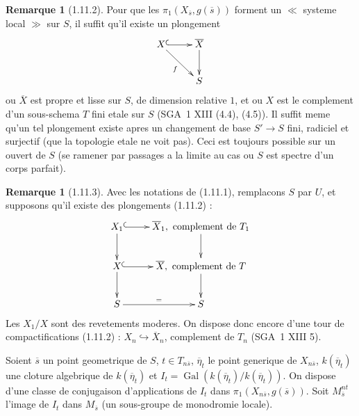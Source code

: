 \documentclass[12pt,a4paper]{article}
\theoremstyle{plain}
\theoremstyle{definition}
\newtheorem{remarque}[theorem]{Remarque}
\theoremstyle{definition}
\theoremstyle{remark}
\DeclareMathOperator{\Gal}{Gal}
\begin{document}
\begin{remarque}[1.11.2]
Pour que les $\pi_1(X_{\overline{s}}, g(\overline{s}))$ forment un $\ll$ systeme local $\gg$ sur $S$, il suffit qu'il existe un plongement
\[\xymatrix{
X \ar@{^{(}->}[r] \ar[dr]_f & \overline{X} \ar[d] \\
& S
}\]
ou $\overline{X}$ est propre et lisse sur $S$, de dimension relative $1$, et ou $X$ est le complement d'un sous-schema $T$ fini etale sur $S$ (SGA~1 XIII (4.4), (4.5)). Il suffit meme qu'un tel plongement existe apres un changement de base $S' \to S$ fini, radiciel et surjectif (que la topologie etale ne voit pas). Ceci est toujours possible sur un ouvert de $S$ (se ramener par passages a la limite au cas ou $S$ est spectre d'un corps parfait).
\end{remarque}

\begin{remarque}[1.11.3]
Avec les notations de (1.11.1), remplacons $S$ par $U$, et supposons qu'il existe des plongements (1.11.2) :
\[\xymatrix{
X_1 \ar@{^{(}->}[r] \ar[d] & \overline{X}_1, \text{ complement de } T_1 \ar[d] \\
X \ar@{^{(}->}[r] \ar[d] & \overline{X}, \text{ complement de } T \ar[d] \\
S \ar[r]^{=} & S
}\]
Les $X_1/X$ sont des revetements moderes. On dispose donc encore d'une tour de compactifications (1.11.2) : $X_n \hookrightarrow \overline{X}_n$, complement de $T_n$ (SGA~1 XIII 5).

Soient $\overline{s}$ un point geometrique de $S$, $t \in T_{n\overline{s}}$, $\overline{\eta}_t$ le point generique de $X_{n\overline{s}}$, $k(\overline{\eta}_t)$ une cloture algebrique de $k(\overline{\eta}_t)$ et $I_t = \Gal(k(\overline{\eta}_t)/k(\overline{\eta}_t))$. On dispose d'une classe de conjugaison d'applications de $I_t$ dans $\pi_1(X_{n\overline{s}}, g(\overline{s}))$. Soit $M_{\overline{s}}^{nt}$ l'image de $I_t$ dans $M_{\overline{s}}$ (un sous-groupe de monodromie locale).
\end{remarque}
\end{document}
